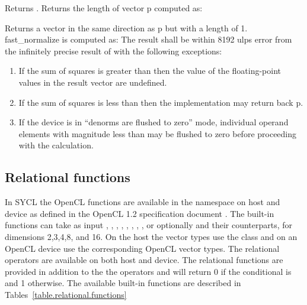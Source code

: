 {
Returns .
}
{
Returns the length of vector p computed as:
}
{
Returns a vector in the same direction as p but with a
length of 1. fast_normalize is computed as:
\newline
The result shall be within 8192 ulps error from the
infinitely precise result of
\newline
{}\newline
{}\newline
{}\newline
with the following exceptions:
\begin{enumerate}
\item If the sum of squares is greater than 
then the value of the floating-point values in the
result vector are undefined.

\item If the sum of squares is less than  then
the implementation may return back p.

\item If the device is in ``denorms are flushed to zero''
mode, individual operand elements with magnitude
less than  may be flushed to zero
before proceeding with the calculation.
\end{enumerate}
}
\completeTable

\subsection{Relational functions}

In SYCL the OpenCL  functions are available in the
namespace  on host and device as defined in the
OpenCL 1.2 specification document \cite[par. 6.12.6]{opencl12}. The
built-in functions can take as input ,
, , , , ,
, ,  or
optionally  and their 
counterparts, for dimensions 2,3,4,8, and 16. On the host the vector
types use the  class and on an OpenCL device use the
corresponding OpenCL vector types.  The relational operators are
available on both host and device.  The relational functions are
provided in addition to the the operators and will return 0 if the
conditional is  and 1 otherwise.  The available
built-in functions are described in
Tables~\ref{table.relational.functions}


